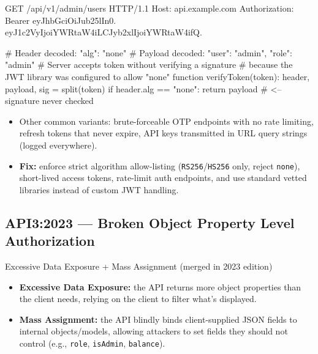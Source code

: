 \documentclass[11pt]{article}
\begin{document}
\begin{httpbox}
GET /api/v1/admin/users HTTP/1.1
Host: api.example.com
Authorization: Bearer eyJhbGciOiJub25lIn0.
  eyJ1c2VyIjoiYWRtaW4iLCJyb2xlIjoiYWRtaW4ifQ.
\end{httpbox}

\begin{pseudobox}
# Header decoded: {"alg": "none"}
# Payload decoded: {"user": "admin", "role": "admin"}
# Server accepts token without verifying a signature
# because the JWT library was configured to allow "none"
function verifyToken(token):
    header, payload, sig = split(token)
    if header.alg == "none":
        return payload    # <-- signature never checked
\end{pseudobox}

\begin{itemize}
  \item Other common variants: brute-forceable OTP endpoints with no rate limiting, refresh tokens that never expire, API keys transmitted in URL query strings (logged everywhere).
  \item \textbf{Fix:} enforce strict algorithm allow-listing (\texttt{RS256}/\texttt{HS256} only, reject \texttt{none}), short-lived access tokens, rate-limit auth endpoints, and use standard vetted libraries instead of custom JWT handling.
\end{itemize}

\subsection{API3:2023 --- Broken Object Property Level Authorization}
\begin{vulnbox}{Excessive Data Exposure + Mass Assignment (merged in 2023 edition)}
\begin{itemize}
  \item \textbf{Excessive Data Exposure:} the API returns more object properties than the client needs, relying on the client to filter what's displayed.
  \item \textbf{Mass Assignment:} the API blindly binds client-supplied JSON fields to internal objects/models, allowing attackers to set fields they should not control (e.g., \texttt{role}, \texttt{isAdmin}, \texttt{balance}).
\end{itemize}
\end{vulnbox}

\end{document}
